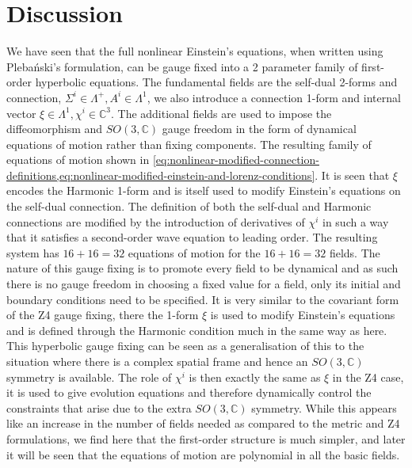 \documentclass[10pt]{report}
\newcommand{\pleb}[0]{Pleba\'nski}
\theoremstyle{definition}
\newcommand{\C}[0]{\mathbb{C}}
\begin{document}
    \section{Discussion}

    We have seen that the full nonlinear Einstein's equations, when written using \pleb{}'s formulation, can be gauge fixed into a 2 parameter family of first-order hyperbolic equations. The fundamental fields are the self-dual 2-forms and connection, $\Sigma^i \in \Lambda^+, A^i \in \Lambda^1$, we also introduce a connection 1-form and internal vector $\xi \in \Lambda^1, \chi^i \in \C^3$. The additional fields are used to impose the diffeomorphism and $SO(3,\C)$ gauge freedom in the form of dynamical equations of motion rather than fixing components. The resulting family of equations of motion shown in \cref{eq:nonlinear-modified-connection-definitions,eq:nonlinear-modified-einstein-and-lorenz-conditions}. It is seen that $\xi$ encodes the Harmonic 1-form and is itself used to modify Einstein's equations on the self-dual connection. The definition of both the self-dual and Harmonic connections are modified by the introduction of derivatives of $\chi^i$ in such a way that it satisfies a second-order wave equation to leading order. The resulting system has $16 + 16 = 32$ equations of motion for the $16 + 16 = 32$ fields. The nature of this gauge fixing is to promote every field to be dynamical and as such there is no gauge freedom in choosing a fixed value for a field, only its initial and boundary conditions need to be specified. It is very similar to the covariant form of the Z4 gauge fixing, there the 1-form $\xi$ is used to modify Einstein's equations and is defined through the Harmonic condition much in the same way as here. This hyperbolic gauge fixing can be seen as a generalisation of this to the situation where there is a complex spatial frame and hence an $SO(3,\C)$ symmetry is available. The role of $\chi^i$ is then exactly the same as $\xi$ in the Z4 case, it is used to give evolution equations and therefore dynamically control the constraints that arise due to the extra $SO(3,\C)$ symmetry. While this appears like an increase in the number of fields needed as compared to the metric and Z4 formulations, we find here that the first-order structure is much simpler, and later it will be seen that the equations of motion are polynomial in all the basic fields. 
\end{document}
